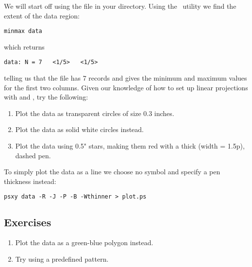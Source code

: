 \documentclass{report}
\begin{document}
We will start off using the file  in your directory.
Using the \GMT\ utility  we find the extent of the
data region:

{\small\begin{verbatim}
minmax data
\end{verbatim}
}

\noindent
which returns

{\small\begin{verbatim}
data: N = 7   <1/5>   <1/5>
\end{verbatim}
}

\noindent
telling us that the file  has 7 records and gives the
minimum and maximum values for the first two columns.  Given our
knowledge of how to set up linear projections with  and ,
try the following:

\begin{enumerate}

\item Plot the data as transparent circles of size 0.3 inches.

\item Plot the data as solid white circles instead.

\item Plot the data using 0.5" stars, making them red with a thick (width = 1.5p),
dashed pen.

\end{enumerate}

To simply plot the data as a line we choose no symbol and specify a pen thickness instead:

{\small\begin{verbatim} 
psxy data -R -J -P -B -Wthinner > plot.ps
\end{verbatim}
}

\subsection{Exercises}

\begin{enumerate}

\item Plot the data as a green-blue polygon instead.

\item Try using a predefined pattern.

\end{enumerate}
\end{document}
